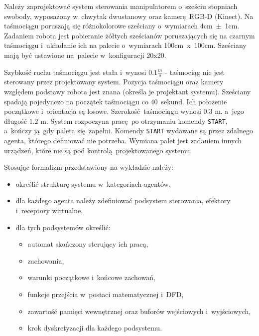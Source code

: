 Należy zaprojektować system sterowania manipulatorem o~sześciu stopniach swobody, wyposażony w~chwytak dwustanowy oraz kamerę RGB-D (Kinect). Na taśmociągu poruszają się różnokolorowe sześciany o~wymiarach 4cm~$\pm$~1cm. Zadaniem robota jest pobieranie żółtych sześcianów poruszających się na czarnym taśmociągu i~układanie ich na palecie o~wymiarach 100cm~x~100cm. Sześciany mają być ustawione na~palecie w~konfiguracji 20x20. 

Szybkość ruchu taśmociągu jest stała i~wynosi $\num{0,1}\frac{m}{s}$ - taśmociąg nie jest sterowany przez projektowany system. Pozycja taśmociągu oraz kamery względem podstawy robota jest znana (określa je projektant systemu). Sześciany spadają pojedynczo na początek taśmociągu co 40~sekund. Ich położenie początkowe i~orientacja są losowe. Szerokość taśmociągu wynosi $\num{0.3}$ m, a~jego długość $\num{1,2}$ m. System rozpoczyna pracę po otrzymaniu komendy \texttt{START}, a~kończy ją gdy paleta się zapełni. Komendy \texttt{START} wydawane są przez zdalnego agenta, którego definiować nie potrzeba. Wymiana palet jest zadaniem innych urządzeń, które nie są pod kontrolą projektowanego systemu.

Stosując formalizm przedstawiony na wykładzie należy:
\begin{itemize}
    \item określić strukturę systemu w~kategoriach agentów,
    \item dla każdego agenta należy zdefiniować podsystem sterowania, efektory i~receptory wirtualne,
    \item dla tych podsystemów określić:
    \begin{itemize}
        \item automat skończony sterujący ich pracą,
        \item zachowania,
        \item warunki początkowe i~końcowe zachowań,
        \item funkcje przejścia w~postaci matematycznej i~DFD,
        \item zawartość pamięci wewnętrznej oraz buforów wejściowych i~wyjściowych,
        \item krok dyskretyzacji dla każdego podsystemu.
    \end{itemize}
\end{itemize}
